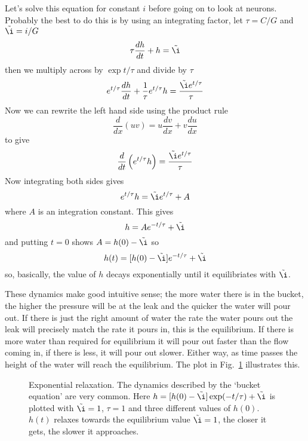 \documentclass[11pt,a4paper]{scrartcl}
\begin{document}
Let's solve this equation for constant $i$ before going on to look at
neurons. Probably the best to do this is by using an integrating
factor, let $\tau=C/G$ and $\tilde{\i}=i/G$
\begin{equation}
\tau\frac{dh}{dt}+h=\tilde{\i}
\end{equation}
then we multiply across by $\exp{t/\tau}$ and divide by $\tau$
\begin{equation}
e^{t/\tau}\frac{dh}{dt}+\frac{1}{\tau}e^{t/\tau}h=\frac{\tilde{\i}e^{t/\tau}}{\tau}
\end{equation}
Now we can rewrite the left hand side using the product rule
\begin{equation}
\frac{d}{dx}(uv)=u\frac{dv}{dx}+v\frac{du}{dx}
\end{equation}
to give
\begin{equation}
\frac{d}{dt}\left(e^{t/\tau}h\right)=\frac{\tilde{\i}e^{t/\tau}}{\tau}
\end{equation}
Now integrating both sides gives
\begin{equation}
e^{t/\tau}h=\tilde{\i}e^{t/\tau}+A
\end{equation}
where $A$ is an integration constant. This gives
\begin{equation}
h=Ae^{-t/\tau}+\tilde{\i}
\end{equation}
and putting $t=0$ shows $A=h(0)-\tilde{\i}$ so
\begin{equation}
h(t)=[h(0)-\tilde{\i}]e^{-t/\tau}+\tilde{\i}
\end{equation}
so, basically, the value of $h$ decays exponentially until it
equilibriates with $\tilde{\i}$.

These dynamics make good intuitive sense; the more water there is in
the bucket, the higher the pressure will be at the leak and the
quicker the water will pour out. If there is just the right amount of
water the rate the water pours out the leak will precisely match the
rate it pours in, this is the equilibrium. If there is more water than
required for equilibrium it will pour out faster than the flow coming
in, if there is less, it will pour out slower. Either way, as time
passes the height of the water will reach the equilibrium. The plot in
Fig.~\ref{bucket_v} illustrates this.

\begin{figure}
\begin{center}

\end{center}
\caption{Exponential relaxation. The dynamics described by the
  \lq{}bucket equation\rq{} are very common. Here
  $h=[h(0)-\tilde{\i}]\exp(-t/\tau)+\tilde{\i}$ is plotted with
  $\tilde{\i}=1$, $\tau=1$ and three different values of
  $h(0)$. $h(t)$ relaxes towards the equilibrium value $\tilde{\i}=1$,
  the closer it gets, the slower it approaches.\label{bucket_v}}
\end{figure}
\end{document}
